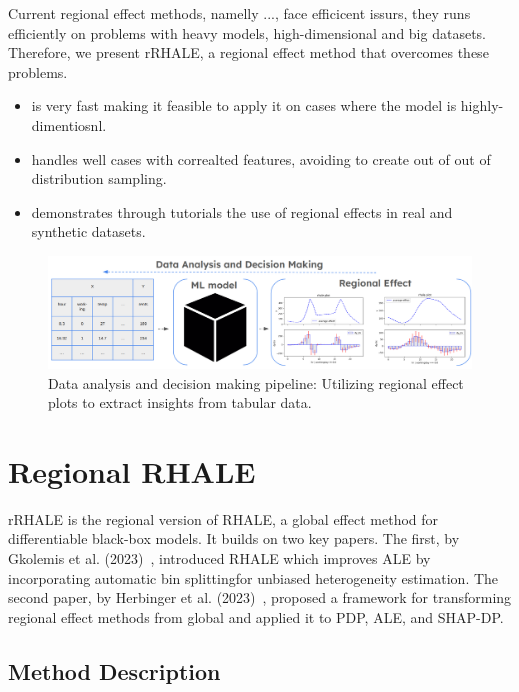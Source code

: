\documentclass[
twocolumn,
]{ceurart}
\begin{document}
Current regional effect methods, namelly ..., face efficicent issurs, they runs efficiently on problems with heavy models, high-dimensional and big datasets. Therefore, we present rRHALE, a regional effect method that overcomes these problems.

\begin{itemize}
\item is very fast making it feasible to apply it on cases where the model is highly-dimentiosnl.
\item handles well cases with correalted features, avoiding to create out of out of distribution sampling.
\item demonstrates through tutorials the use of regional effects in real and synthetic datasets.
\end{itemize}

\begin{figure}[t]
    \centering
    \includegraphics[width=\textwidth]{figures/concept_image.png}
    \caption{Data analysis and decision making pipeline: Utilizing regional effect plots to extract insights from tabular data.}
    \label{fig:concept_figure}
\end{figure}

\section{Regional RHALE}


rRHALE is the regional version of RHALE, a global effect method for differentiable black-box models. It builds on two key papers. The first, by Gkolemis et al. (2023)~\citep{gkolemis2023rhale}, introduced RHALE which improves ALE by incorporating automatic bin splittingfor unbiased heterogeneity estimation. The second paper, by Herbinger et al. (2023)~\citep{herbinger2023decomposing}, proposed a framework for transforming regional effect methods from global and applied it to PDP, ALE, and SHAP-DP.

\subsection{Method Description}
\end{document}
